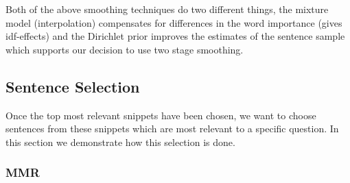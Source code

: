 \documentclass[11pt,a4paper]{article}
\begin{document}
Both of the above smoothing techniques do two different things, the mixture model (interpolation) compensates for differences in the word importance (gives idf-effects) and the Dirichlet prior improves the estimates of the sentence sample which supports our decision to use two stage smoothing. 




\subsection{Sentence Selection}
Once the top most relevant snippets have been chosen, we want to choose sentences from these snippets which are most relevant to a specific question. In this section we demonstrate how this selection is done.

\subsubsection{MMR}
\end{document}
